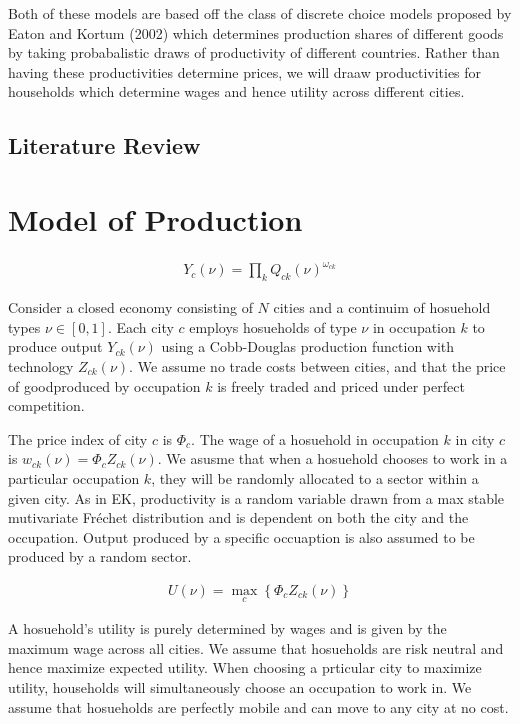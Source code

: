 \documentclass[10pt]{article}
\begin{document}
Both of these models are based off the class of discrete choice models proposed by Eaton and Kortum (2002) which determines production shares of different goods by taking probabalistic draws of productivity of different countries. Rather than having these productivities determine prices, we will draaw productivities for households which determine wages and hence utility across different cities.

\subsection{Literature Review}

\section{Model of Production}

\begin{align}
    Y_{c} (\nu) = \prod_k Q_{ck} (\nu)^{\omega_{ck}}
\end{align}

Consider a closed economy consisting of $N$ cities and a continuim of hosuehold types $\nu \in [0, 1]$. Each city $c$ employs hosueholds of type $\nu$ in occupation $k$ to produce output $Y_{ck} (\nu)$ using a Cobb-Douglas production function with technology $Z_{ck} (\nu)$. We assume no trade costs between cities, and that the price of goodproduced by occupation $k$ is freely traded and priced under perfect competition.

The price index of city $c$ is $\Phi_c$. The wage of a hosuehold in occupation $k$ in city $c$ is $w_{ck} (\nu) = \Phi_c Z_{ck} (\nu)$. We asusme that when a hosuehold chooses to work in a particular occupation $k$, they will be randomly allocated to a sector within a given city. As in EK, productivity is a random variable drawn from a max stable mutivariate Fr\'{e}chet distribution and is dependent on both the city and the occupation. Output produced by a specific occuaption is also assumed to be produced by a random sector.

\begin{align}
    U (\nu) = \max_c \left\{ \Phi_c Z_{ck} (\nu) \right\}
\end{align}

A hosuehold's utility is purely determined by wages and is given by the maximum wage across all cities. We assume that hosueholds are risk neutral and hence maximize expected utility. When choosing a prticular city to maximize utility, households will simultaneously choose an occupation to work in. We assume that hosueholds are perfectly mobile and can move to any city at no cost.
\end{document}
